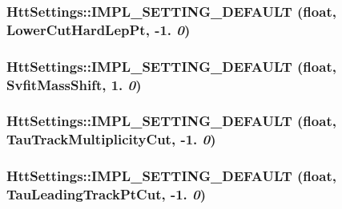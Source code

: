 \label{classHttSettings_a3a66cee45e0ac72fda735e26fa63fe76}
\hypertarget{classHttSettings_a630faf528cca577605aec717039f7114}{
\subsubsection[{IMPL\_\-SETTING\_\-DEFAULT}]{\setlength{\rightskip}{0pt plus 5cm}HttSettings::IMPL\_\-SETTING\_\-DEFAULT (float, \/  LowerCutHardLepPt, \/  -\/1. {\em 0})}}
\label{classHttSettings_a630faf528cca577605aec717039f7114}
\hypertarget{classHttSettings_ab04b9f8ef9fb66c65a4832f199d6867c}{
\subsubsection[{IMPL\_\-SETTING\_\-DEFAULT}]{\setlength{\rightskip}{0pt plus 5cm}HttSettings::IMPL\_\-SETTING\_\-DEFAULT (float, \/  SvfitMassShift, \/  1. {\em 0})}}
\label{classHttSettings_ab04b9f8ef9fb66c65a4832f199d6867c}
\hypertarget{classHttSettings_a71d7c6ca9c1d8304ebb02c4ad4393962}{
\subsubsection[{IMPL\_\-SETTING\_\-DEFAULT}]{\setlength{\rightskip}{0pt plus 5cm}HttSettings::IMPL\_\-SETTING\_\-DEFAULT (float, \/  TauTrackMultiplicityCut, \/  -\/1. {\em 0})}}
\label{classHttSettings_a71d7c6ca9c1d8304ebb02c4ad4393962}
\hypertarget{classHttSettings_a589c74328a3eccca2bd0ab46f667df15}{
\subsubsection[{IMPL\_\-SETTING\_\-DEFAULT}]{\setlength{\rightskip}{0pt plus 5cm}HttSettings::IMPL\_\-SETTING\_\-DEFAULT (float, \/  TauLeadingTrackPtCut, \/  -\/1. {\em 0})}}
\label{classHttSettings_a589c74328a3eccca2bd0ab46f667df15}
